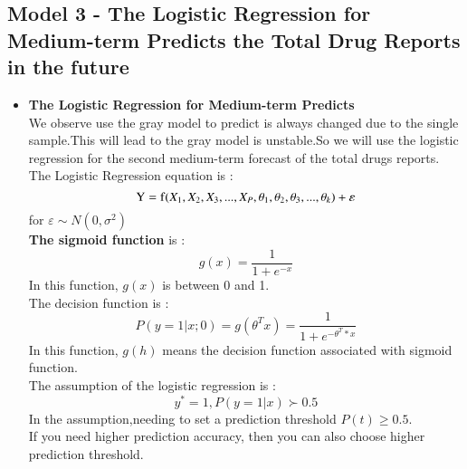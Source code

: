 \documentclass{mcmthesis}
\begin{document}
\subsection{Model 3 - The Logistic Regression for Medium-term Predicts the Total Drug Reports in the future }%
\begin{itemize}
\item \textbf{The Logistic Regression for Medium-term Predicts} \\%
We observe use the gray model to predict is always changed due to the single sample.This will lead to the gray model is unstable.So we will use the logistic regression for the second medium-term forecast of the total drugs reports.\\ 
The Logistic Regression equation  is  : \\%
\begin{equation}
{\rm{Y = f}}({X_1},{X_2},{X_3},...,{X_P},{\theta _1},{\theta _2},{\theta _3},...,{\theta _k}) + \varepsilon 
\end{equation}
for $\varepsilon  \sim N(0,{\sigma ^2})$ \\
\textbf{The sigmoid function} is : \\
\begin{equation}
	g(x) = \frac{1}{{1 + {e^{ - x}}}}
\end{equation}
In this function, $ g(x)$ is between 0 and 1.\\
The decision function is : \\%
\begin{equation}
     P(y = 1|x;0) = g({\theta ^T}x) = \frac{1}{{1 + {e^{ - {\theta ^T}*x}}}}
\end{equation}
In this function, $g(h)$ means the decision function associated with sigmoid function. \\
The assumption of the logistic regression is : \\
\begin{equation}
	{y^*} = 1   ,P(y = 1|x) \succ 0.5
\end{equation}
In the assumption,needing to set a prediction threshold $P(t) \ge0.5 $.\\
If you need higher prediction accuracy, then you can also choose higher prediction threshold.\\
\end{itemize}
\end{document}
